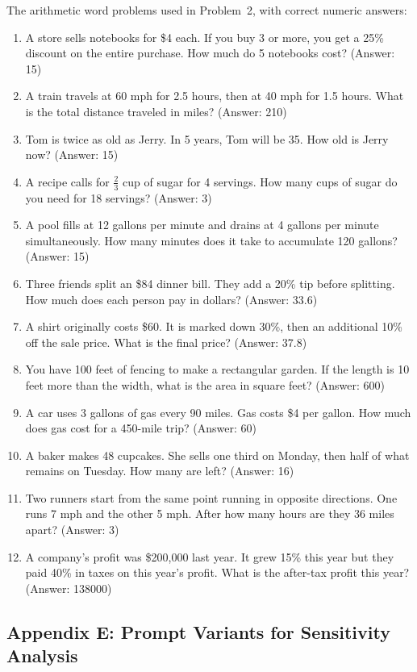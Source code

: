The arithmetic word problems used in Problem~2, with correct numeric answers:
\begin{enumerate}
  \item A store sells notebooks for \$4 each. If you buy 3 or more, you get a 25\% discount on the entire purchase. How much do 5 notebooks cost? (Answer: 15)
  \item A train travels at 60 mph for 2.5 hours, then at 40 mph for 1.5 hours. What is the total distance traveled in miles? (Answer: 210)
  \item Tom is twice as old as Jerry. In 5 years, Tom will be 35. How old is Jerry now? (Answer: 15)
  \item A recipe calls for $\tfrac{2}{3}$ cup of sugar for 4 servings. How many cups of sugar do you need for 18 servings? (Answer: 3)
  \item A pool fills at 12 gallons per minute and drains at 4 gallons per minute simultaneously. How many minutes does it take to accumulate 120 gallons? (Answer: 15)
  \item Three friends split an \$84 dinner bill. They add a 20\% tip before splitting. How much does each person pay in dollars? (Answer: 33.6)
  \item A shirt originally costs \$60. It is marked down 30\%, then an additional 10\% off the sale price. What is the final price? (Answer: 37.8)
  \item You have 100 feet of fencing to make a rectangular garden. If the length is 10 feet more than the width, what is the area in square feet? (Answer: 600)
  \item A car uses 3 gallons of gas every 90 miles. Gas costs \$4 per gallon. How much does gas cost for a 450-mile trip? (Answer: 60)
  \item A baker makes 48 cupcakes. She sells one third on Monday, then half of what remains on Tuesday. How many are left? (Answer: 16)
  \item Two runners start from the same point running in opposite directions. One runs 7 mph and the other 5 mph. After how many hours are they 36 miles apart? (Answer: 3)
  \item A company's profit was \$200{,}000 last year. It grew 15\% this year but they paid 40\% in taxes on this year's profit. What is the after-tax profit this year? (Answer: 138000)
\end{enumerate}

\newpage
\subsection*{Appendix E: Prompt Variants for Sensitivity Analysis}
\label{app:sensitivity}

